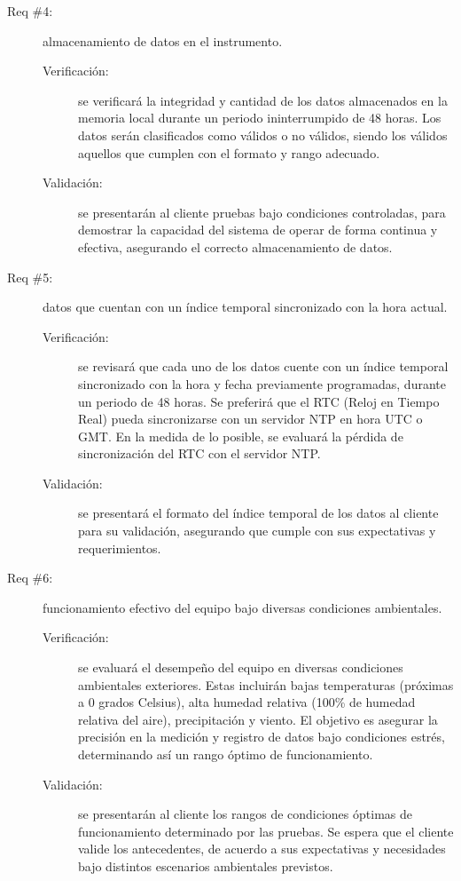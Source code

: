 \begin{description}
	\item [Req \#4:] almacenamiento de datos en el instrumento.
	
	\begin{description}
		\item [Verificación:] se verificará la integridad y cantidad de los datos almacenados en la memoria local durante un periodo ininterrumpido de 48 horas. Los datos serán clasificados como válidos o no válidos, siendo los válidos aquellos que cumplen con el formato y rango adecuado.
		\item [Validación:] se presentarán al cliente pruebas bajo condiciones controladas, para demostrar la capacidad del sistema de operar de forma continua y efectiva, asegurando el correcto almacenamiento de datos.
	\end{description}
	
	\item [Req \#5:] datos que cuentan con un índice temporal sincronizado con la hora actual.
	\begin{description}
		\item [Verificación:] se revisará que cada uno de los datos cuente con un índice temporal sincronizado con la hora y fecha previamente programadas, durante un periodo de 48 horas. Se preferirá que el RTC (Reloj en Tiempo Real) pueda sincronizarse con un servidor NTP en hora UTC o GMT. En la medida de lo posible, se evaluará la pérdida de sincronización del RTC con el servidor NTP.
		\item [Validación:] se presentará el formato del índice temporal de los datos al cliente para su validación, asegurando que cumple con sus expectativas y requerimientos.
	\end{description}
	
	\item [Req \#6:] funcionamiento efectivo del equipo bajo diversas condiciones ambientales. 
	\begin{description}
		\item [Verificación:] se evaluará el desempeño del equipo en diversas condiciones ambientales exteriores. Estas incluirán bajas temperaturas (próximas a 0 grados Celsius), alta humedad relativa (100\% de humedad relativa del aire), precipitación y viento. El objetivo es asegurar la precisión en la medición y registro de datos bajo condiciones estrés, determinando así un rango óptimo de funcionamiento.
		\item [Validación:] se presentarán al cliente los rangos de condiciones óptimas de funcionamiento determinado por las pruebas. Se espera que el cliente valide los antecedentes, de acuerdo a sus expectativas y necesidades bajo distintos escenarios ambientales previstos.
	\end{description}
	

\end{description}
